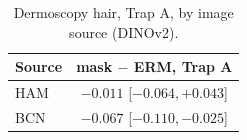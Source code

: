 \begin{table}[H]\centering\small
\caption{Dermoscopy hair, Trap A, by image source (DINOv2).}\label{tab:src}
\begin{tabular}{lc}\toprule
Source & mask $-$ ERM, Trap A \\\midrule
HAM & $-0.011$ [$-0.064, +0.043$] \\
BCN & $-0.067$ [$-0.110, -0.025$] \\
\bottomrule\end{tabular}
\end{table}
